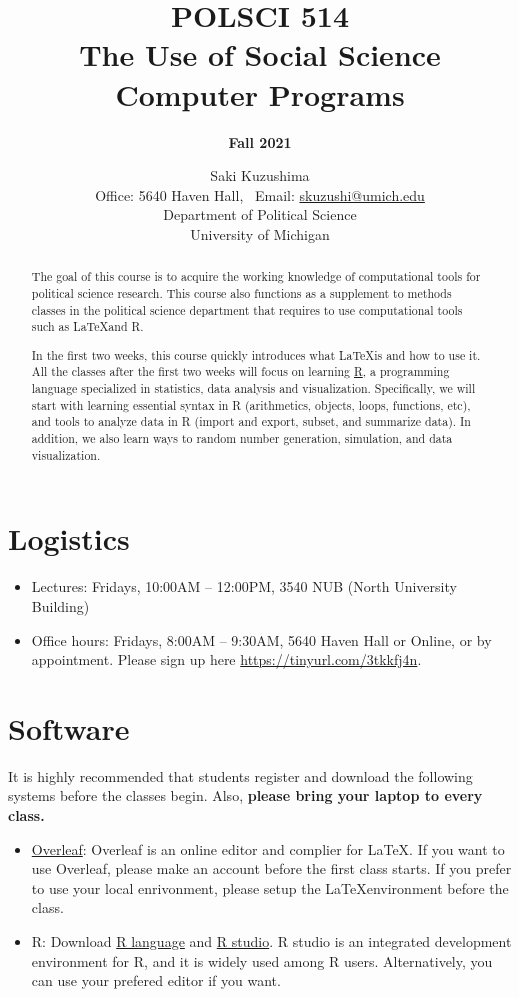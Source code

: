 \documentclass[11pt]{article}
\title{\bf POLSCI 514 \\ The Use of Social Science Computer Programs}
\author{\Large {\bf Fall 2021}}
\date{\large Saki Kuzushima \\ \medskip
  Office: 5640 Haven Hall, \ Email: \href{mailto:skuzushi@umich.edu}{skuzushi@umich.edu} \\ \medskip
  Department of Political Science \\ University of Michigan}
\begin{document}
\maketitle

\begin{abstract}
The goal of this course is to acquire the working knowledge of computational tools for political science research.
This course also functions as a supplement to methods classes in the political science department that requires to use computational tools such as \LaTeX and R.

In the first two weeks, this course quickly introduces what \LaTeX is and how to use it. 
All the classes after the first two weeks will focus on learning \href{https://www.r-proect.org/}{R}, a programming language specialized in statistics, data analysis and visualization.
Specifically, we will start with learning essential syntax in R (arithmetics, objects, loops, functions, etc), and tools to analyze data in R (import and export, subset, and summarize data).
In addition, we also learn ways to random number generation, simulation, and data visualization. 
\end{abstract}


\section{Logistics}

\begin{itemize}
\item Lectures: Fridays, 10:00AM -- 12:00PM, 3540 NUB (North University Building) 
\item Office hours: Fridays, 8:00AM -- 9:30AM, 5640 Haven Hall or Online, or by appointment. Please sign up here \href{https://tinyurl.com/3tkkfj4n}{https://tinyurl.com/3tkkfj4n}.
  
\end{itemize}


\section{Software}

It is highly recommended that students register and download the following systems before the classes begin.
Also, \textbf{please bring your laptop to every class.}

\begin{itemize}
\item \href{https://www.overleaf.com/}{Overleaf}: Overleaf is an online editor and complier for \LaTeX. 
If you want to use Overleaf, please make an account before the first class starts.
If you prefer to use your local enrivonment, please setup the \LaTeX environment before the class.

\item R: Download \href{https://www.r-project.org/}{R language} and \href{https://www.rstudio.com/}{R studio}. 
R studio is an integrated development environment for R, and it is widely used among R users.
Alternatively, you can use your prefered editor if you want.


\end{itemize} 
\end{document}
